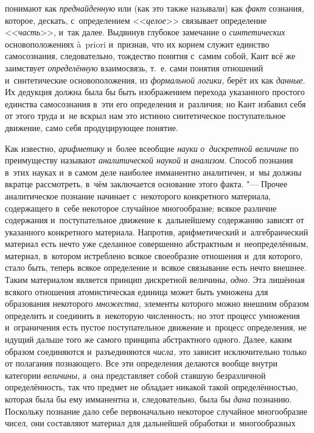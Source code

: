 понимают как {\em преднайденную}
или (как это также называли) как
{\em факт} сознания,
которое, дескать, с~определением
<<{\em целое}>> связывает
определение <<{\em часть}>>,
и~так далее. Выдвинув глубокое замечание о
{\em синтетических}
основоположениях à~priori и~признав, что их корнем служит
единство самосознания, следовательно, тождество понятия с~самим собой, Кант
всё же заимствует {\em определённую}
взаимосвязь, т.~е. сами понятия отношений и~синтетические
основоположения, из {\em формальной
логики,} берёт их как
{\em данные}. Их дедукция
должна была бы быть изображением перехода указанного простого единства
самосознания в~эти его определения и~различия; но Кант избавил себя от
этого труда и~не вскрыл нам это истинно синтетическое поступательное
движение, само себя продуцирующее понятие.

Как известно,
{\em арифметику} и~более
всеобщие {\em науки}
{\em о~дискретной величине}
по преимуществу называют
{\em аналитической наукой}
и {\em анализом}.
Способ познания в~этих науках и~в самом деле наиболее
имманентно аналитичен, и~мы должны вкратце рассмотреть, в~чём заключается
основание этого факта. "--- Прочее аналитическое познание
начинает с~некоторого конкретного материала, содержащего в~себе некоторое
случайное многообразие; всякое различие содержания и~поступательное
движение к~дальнейшему содержанию зависят от указанного конкретного
материала. Напротив, арифметический и~алгебраический материал есть нечто
уже сделанное совершенно абстрактным и~неопределённым, материал, в~котором
истреблено всякое своеобразие отношения и~для которого, стало быть, теперь
всякое определение и~всякое связывание есть нечто внешнее. Таким
материалом является принцип дискретной величины,
{\em одно}. Эта лишённая
всякого отношения атомистическая единица может быть умножена для
образования некоторого {\em множества,}
элементы которого можно внешним образом определить и
соединить в~некоторую численность; но этот процесс умножения и~ограничения
есть пустое поступательное движение и~процесс определения, не идущий дальше
того же самого принципа абстрактного одного. Далее, каким образом
соединяются и~разъединяются
{\em числа,} это зависит
исключительно только от полагания познающего. Все эти определения делаются
вообще внутри категории {\em величины,}
а~она представляет собой ставшую безразличной определённость,
так что предмет не обладает никакой такой определённостью, которая была бы
ему имманентна и, следовательно, была бы
{\em дана} познанию.
Поскольку познание дало себе первоначально некоторое случайное многообразие
чисел, они составляют материал для дальнейшей обработки и~многообразных
